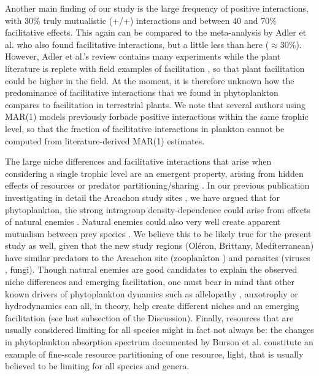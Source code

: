 \documentclass[9pt,twocolumn,twoside,lineno]{pnas-new}
\begin{document}
Another main finding of our study is the large frequency of positive
interactions, with 30\% truly mutualistic (+/+) interactions and between
40 and 70\% facilitative effects. This again can be compared to the
meta-analysis by Adler et al.\cite{adler_competition_2018} who
also found facilitative interactions, but a little less than here
($\approx$30\%). However, Adler et al.\cite{adler_competition_2018}'s
review contains many experiments while the plant literature is replete
with field examples of facilitation \cite{brooker_facilitation_2008,mcintire2014facilitation},
so that plant facilitation could be higher in the field. At the moment,
it is therefore unknown how the predominance of facilitative interactions
that we found in phytoplankton compares to facilitation in terrestrial
plants. We note that several authors using MAR(1) models previously
forbade positive interactions within the same trophic level, so that
the fraction of facilitative interactions in plankton cannot be computed
from literature-derived MAR(1) estimates.

The large niche differences and facilitative interactions that arise
when considering a single trophic level are an emergent property,
arising from hidden effects of resources or predator partitioning/sharing \cite{chesson_updates_2018}.
In our previous publication investigating in detail the Arcachon study
sites \cite{barraquand_coastal_2018}, we have argued that for
phytoplankton, the strong intragroup density-dependence could arise
from effects of natural enemies \cite{haydon_pivotal_1994,barraquand_coastal_2018}.
Natural enemies could also very well create apparent mutualism between
prey species \cite{abrams_apparent_1998,barraquand_indirect_2015,de_ruiter_emergent_2017}.
We believe this to be likely true for the present study as well, given
that the new study regions (Oléron, Brittany, Mediterranean) have
similar predators to the Arcachon site (zooplankton )
and parasites (viruses , fungi). Though
natural enemies are good candidates to explain the observed niche
differences and emerging facilitation, one must bear in mind that
other known drivers of phytoplankton dynamics such as allelopathy \cite{felpeto_allelopathy_2018},
auxotrophy \cite{tang_most_2010} or hydrodynamics \cite{levy_role_2018}
can all, in theory, help create different niches and an emerging facilitation
(see last subsection of the Discussion). Finally, resources that are
usually considered limiting for all species might in fact not always
be: the changes in phytoplankton absorption spectrum documented by
Burson et al. \cite{burson_competition_2018} constitute an example
of fine-scale resource partitioning of one resource, light, that is
usually believed to be limiting for all species and genera.
\end{document}
